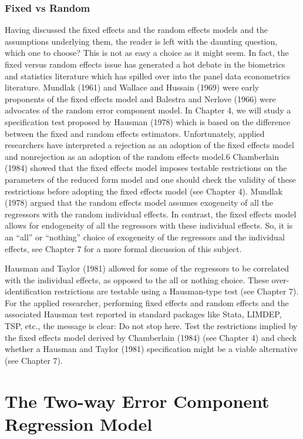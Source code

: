 \documentclass[
]{book}
\begin{document}
\hypertarget{fixed-vs-random}{%
\subsection{Fixed vs Random}\label{fixed-vs-random}}

Having discussed the fixed effects and the random effects models and the assumptions underlying them, the reader is left with the daunting question, which one to choose? This is not as easy a choice as it might seem. In fact, the fixed versus random effects issue has generated a hot debate in the biometrics and statistics literature which has spilled over into the panel data econometrics literature. Mundlak (1961) and Wallace and Hussain (1969) were early proponents of the fixed effects model and Balestra and Nerlove (1966) were advocates of the random error component model. In Chapter 4, we will study a specification test proposed by Hausman (1978) which is based on the difference between the fixed and random effects estimators. Unfortunately, applied researchers have interpreted a rejection as an adoption of the fixed effects model and nonrejection as an adoption of the random effects model.6 Chamberlain (1984) showed that the fixed effects model imposes testable restrictions on the parameters of the reduced form model and one should check the validity of these restrictions before adopting the fixed effects model (see Chapter 4). Mundlak (1978) argued that the random effects model assumes exogeneity of all the regressors with the random individual effects. In contrast, the fixed effects model allows for endogeneity of all the regressors with these individual effects. So, it is an ``all'' or ``nothing'' choice of exogeneity of the regressors and the individual effects, see Chapter 7 for a more formal discussion of this subject.

Hausman and Taylor (1981) allowed for some of the regressors to be correlated with the individual effects, as opposed to the all or nothing choice. These over-identification restrictions are testable using a Hausman-type test (see Chapter 7). For the applied researcher, performing fixed effects and random effects and the associated Hausman test reported in standard packages like Stata, LIMDEP, TSP, etc., the message is clear: Do not stop here. Test the restrictions implied by the fixed effects model derived by Chamberlain (1984) (see Chapter 4) and check whether a Hausman and Taylor (1981) specification might be a viable alternative (see Chapter 7).

\hypertarget{the-two-way-error-component-regression-model}{%
\chapter{The Two-way Error Component Regression Model}\label{the-two-way-error-component-regression-model}}
\end{document}
